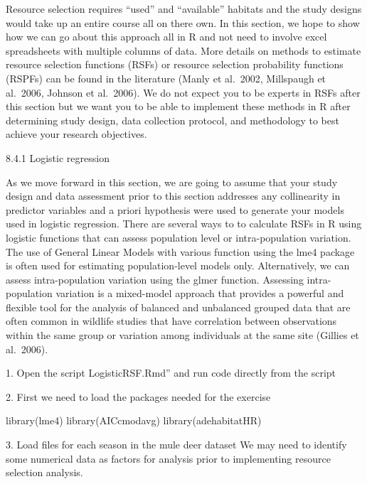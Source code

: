 \documentclass[
  letterpaper,
]{book}
\newenvironment{Shaded}{\begin{snugshade}}{\end{snugshade}}
\newcommand{\FunctionTok}[1]{\textcolor[rgb]{0.28,0.35,0.67}{#1}}
\newcommand{\NormalTok}[1]{\textcolor[rgb]{0.00,0.23,0.31}{#1}}
\begin{document}
Resource selection requires ``used'' and ``available'' habitats and the
study designs would take up an entire course all on there own. In this
section, we hope to show how we can go about this approach all in R and
not need to involve excel spreadsheets with multiple columns of data.
More details on methods to estimate resource selection functions (RSFs)
or resource selection probability functions (RSPFs) can be found in the
literature (Manly et al.~2002, Millspaugh et al.~2006, Johnson et
al.~2006). We do not expect you to be experts in RSFs after this section
but we want you to be able to implement these methods in R after
determining study design, data collection protocol, and methodology to
best achieve your research objectives.

8.4.1 Logistic regression

As we move forward in this section, we are going to assume that your
study design and data assessment prior to this section addresses any
collinearity in predictor variables and a priori hypothesis were used to
generate your models used in logistic regression. There are several ways
to to calculate RSFs in R using logistic functions that can assess
population level or intra-population variation. The use of General
Linear Models with various function using the lme4 package is often used
for estimating population-level models only. Alternatively, we can
assess intra-population variation using the glmer function. Assessing
intra-population variation is a mixed-model approach that provides a
powerful and flexible tool for the analysis of balanced and unbalanced
grouped data that are often common in wildlife studies that have
correlation between observations within the same group or variation
among individuals at the same site (Gillies et al.~2006).

1. Open the script LogisticRSF.Rmd'' and run code directly from the
script

2. First we need to load the packages needed for the exercise

\begin{Shaded}
\begin{Highlighting}[]
\FunctionTok{library}\NormalTok{(lme4)}
\FunctionTok{library}\NormalTok{(AICcmodavg)}
\FunctionTok{library}\NormalTok{(adehabitatHR)}
\end{Highlighting}
\end{Shaded}

3. Load files for each season in the mule deer dataset We may need to
identify some numerical data as factors for analysis prior to
implementing resource selection analysis.
\end{document}
